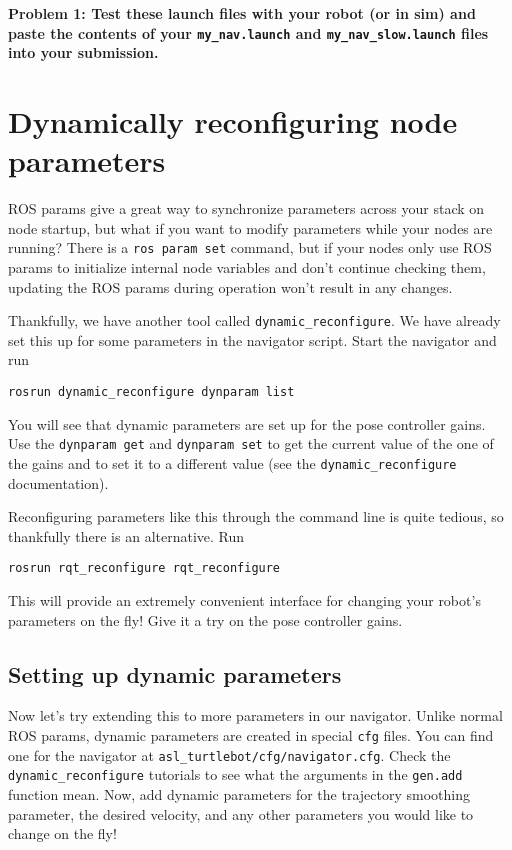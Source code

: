 \documentclass{article}
\begin{document}
{\bf Problem 1: Test these launch files with your robot (or in sim) and paste the contents of your \texttt{my\_nav.launch} and \texttt{my\_nav\_slow.launch} files into your submission.}

\section{Dynamically reconfiguring node parameters}
ROS params give a great way to synchronize parameters across your stack on node startup, but what if you want to modify parameters while your nodes are running? There is a \texttt{ros param set} command, but if your nodes only use ROS params to initialize internal node variables and don't continue checking them, updating the ROS params during operation won't result in any changes.

Thankfully, we have another tool called \texttt{dynamic\_reconfigure}. We have already set this up for some parameters in the navigator script. Start the navigator and run
\begin{lstlisting}
rosrun dynamic_reconfigure dynparam list
\end{lstlisting}

You will see that dynamic parameters are set up for the pose controller gains. Use the \texttt{dynparam get} and \texttt{dynparam set} to get the current value of the one of the gains and to set it to a different value (see the \texttt{dynamic\_reconfigure} documentation).

Reconfiguring parameters like this through the command line is quite tedious, so thankfully there is an alternative. Run
\begin{lstlisting}
rosrun rqt_reconfigure rqt_reconfigure
\end{lstlisting}

This will provide an extremely convenient interface for changing your robot's parameters on the fly! Give it a try on the pose controller gains.

\subsection{Setting up dynamic parameters}
Now let's try extending this to more parameters in our navigator. Unlike normal ROS params, dynamic parameters are created in special \texttt{cfg} files. You can find one for the navigator at \texttt{asl\_turtlebot/cfg/navigator.cfg}. Check the \texttt{dynamic\_reconfigure} tutorials to see what the arguments in the \texttt{gen.add} function mean. Now, add dynamic parameters for the trajectory smoothing parameter, the desired velocity, and any other parameters you would like to change on the fly!
\end{document}
